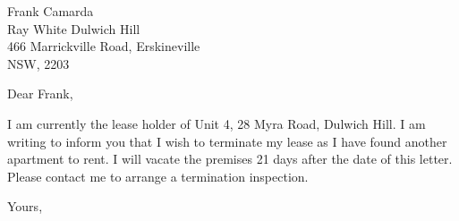 \documentclass{letter}
\begin{document}
\begin{letter}{Frank Camarda \\ Ray White Dulwich Hill \\ 466 Marrickville Road, Erskineville \\ NSW, 2203}
\opening{Dear Frank,}

I am currently the lease holder of Unit 4, 28 Myra Road, Dulwich Hill.  I am
writing to inform you that I wish to terminate my lease as I have  found
another apartment to rent. I will vacate the premises 21 days after the date
of this letter. Please contact me to arrange a termination inspection.

\closing{Yours,}

\end{letter}
\end{document}
